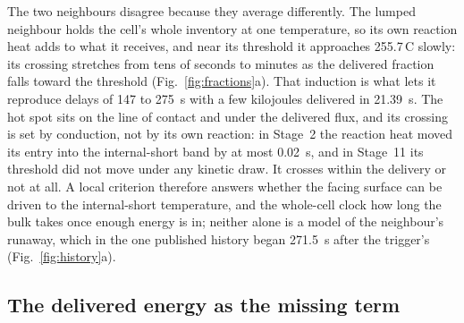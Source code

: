 \documentclass[preprint,12pt]{elsarticle}
\newcommand{\degC}{\,\textdegree C}
\begin{document}
The two neighbours disagree because they average differently. The lumped neighbour holds the cell's whole inventory at one temperature, so its own reaction heat adds to what it receives, and near its threshold it approaches 255.7\degC{} slowly: its crossing stretches from tens of seconds to minutes as the delivered fraction falls toward the threshold (Fig.~\ref{fig:fractions}a). That induction is what lets it reproduce delays of 147 to 275~s with a few kilojoules delivered in 21.39~s. The hot spot sits on the line of contact and under the delivered flux, and its crossing is set by conduction, not by its own reaction: in Stage~2 the reaction heat moved its entry into the internal-short band by at most 0.02~s, and in Stage~11 its threshold did not move under any kinetic draw. It crosses within the delivery or not at all. A local criterion therefore answers whether the facing surface can be driven to the internal-short temperature, and the whole-cell clock how long the bulk takes once enough energy is in; neither alone is a model of the neighbour's runaway, which in the one published history began 271.5~s after the trigger's (Fig.~\ref{fig:history}a).

\subsection{The delivered energy as the missing term}
\label{sec:disc-energy}
\end{document}
